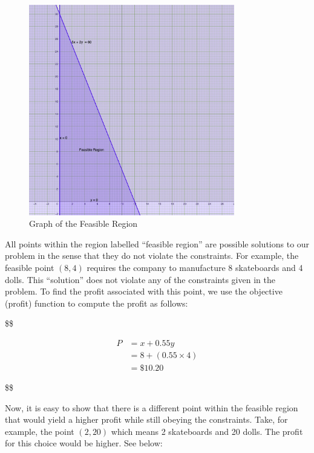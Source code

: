 \documentclass[
  letterpaper,
  DIV=11,
  numbers=noendperiod]{scrreprt}
\begin{document}
\begin{figure}

{\centering \includegraphics[width=0.8\textwidth,height=\textheight]{images/a.jpeg}

}

\caption{Graph of the Feasible Region}

\end{figure}

All points within the region labelled ``feasible region'' are possible
solutions to our problem in the sense that they do not violate the
constraints. For example, the feasible point \((8,4)\) requires the
company to manufacture 8 skateboards and 4 dolls. This ``solution'' does
not violate any of the constraints given in the problem. To find the
profit associated with this point, we use the objective (profit)
function to compute the profit as follows:

\$\$

\begin{align}
P&=x+0.55y\\
&=8+(0.55\times 4)\\
&=\$10.20
\end{align}

\$\$

Now, it is easy to show that there is a different point within the
feasible region that would yield a higher profit while still obeying the
constraints. Take, for example, the point \((2,20)\) which means 2
skateboards and 20 dolls. The profit for this choice would be higher.
See below:
\end{document}
